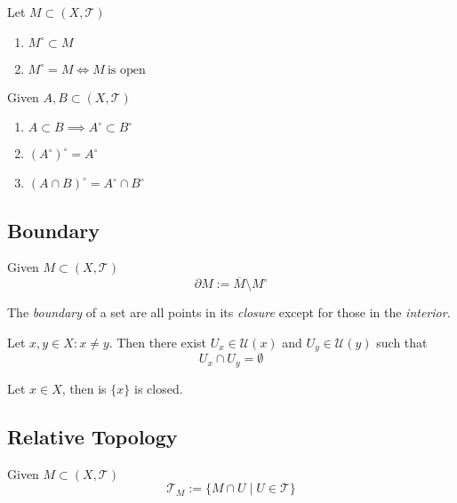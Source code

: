 \begin{theorem}
   Let \(M \subset (X, \mathcal{T})\)
   \begin{enumerate}[label=\roman*, align=Center]
      \item \(M^\circ \subset M\)
      \item \(M^\circ = M \iff M~\text{is open}\)
   \end{enumerate}
\end{theorem}

\begin{theorem}
   Given \(A, B \subset (X, \mathcal{T})\)
   \begin{enumerate}[label=\roman*, align=Center]
      \item \(A \subset B \implies A^\circ \subset B^\circ\)
      \item \((A^\circ)^\circ = A^\circ\)
      \item \((A \cap B)^\circ = A^\circ \cap B^\circ\)
   \end{enumerate}
\end{theorem}

\subsection{Boundary}
\begin{definition}
   Given \(M \subset (X, \mathcal{T})\)
   \[\partial M := \overline{M} \setminus M^\circ\]
\end{definition}
\begin{remark}[Intuition]
   The \emph{boundary} of a set are all points in its \emph{closure} except for those in the \emph{interior}.
\end{remark}

\begin{theorem}
   Let \(x, y \in X: x \neq y\).
   Then there exist \(U_x \in \mathcal{U}(x)\) and \(U_y \in \mathcal{U}(y)\) such that
   \[U_x \cap U_y = \emptyset\]
\end{theorem}

\begin{corollary}
   Let \(x \in X\), then is \(\{x\}\) is closed.
\end{corollary}

\subsection{Relative Topology}
\begin{definition}
   Given \(M \subset (X, \mathcal{T})\)
   \[\mathcal{T}_M := \{M \cap U \mid U \in \mathcal{T}\}\]
\end{definition}

